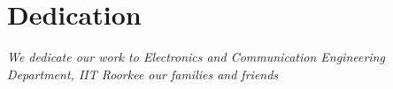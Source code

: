 %
%

\chapter*{Dedication}
\begin{OnehalfSpacing}
\begin{vplace}[0.4]
\begin{center}
\large \textit{We dedicate our work to Electronics and Communication Engineering Department, IIT Roorkee our families and friends}
\end{center}
\end{vplace}
\end{OnehalfSpacing}
\clearpage
